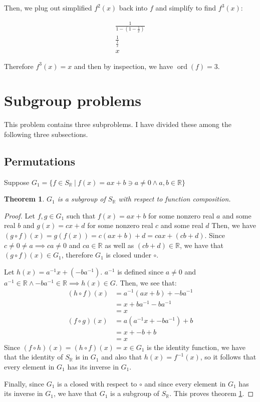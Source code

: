 \documentclass[12pt]{article}
\newcommand{\reals}{\mathbb{R}}
\newcommand{\ord}{\operatorname{ord}}
\newtheorem{thm}{Theorem}
\begin{document}
Then, we plug out simplified $f^2(x)$ back into $f$ and simplify to find $f^3(x)$:

\begin{align}
	\frac{1}{1-(1 - \frac{1}{x})} \\
	\frac{1}{\frac{1}{x}} \\
	x
\end{align}

Therefore $f^3(x) = x$ and then by inspection, we have $\ord(f) = 3$.

\section{Subgroup problems}

This problem contains three subproblems.
I have divided these among the following three subsections.

\subsection{Permutations} \label{sub1}

Suppose $G_1 = \{ f \in S_{\reals}\ |\ f(x) = ax + b \ni a \neq 0 \land a,b \in \reals \}$

\begin{thm} \label{thm5}
	$G_1$ is a subgroup of $S_{\reals}$ with respect to function composition.
\end{thm} 

\begin{proof}
	Let $f,g \in G_1$ such that
	$f(x) = ax + b$ for some nonzero real $a$ and some real $b$ and
	$g(x) = cx + d$ for some nonzero real $c$ and some real $d$
	Then, we have
	$(g \circ f)(x) = g(f(x)) = c(ax + b) + d = cax + (cb + d)$.
	Since $c \neq 0 \neq a \implies ca \neq 0$
	and $ca \in \reals$ as well as $(cb + d) \in \reals$,
	we have that $(g \circ f)(x) \in G_1$,
	therefore $G_1$ is closed under $\circ$.

	Let $h(x) = a^{-1}x + (-ba^{-1})$.
	$a^{-1}$ is defined since $a \neq 0$
	and $a^{-1} \in \reals \land -ba^{-1} \in \reals \implies h(x) \in G$.
	Then, we see that:
	\begin{align*}
		(h \circ f)(x) & = a^{-1}(ax + b) + -ba^{-1} \\
			       & = x + ba^{-1} -ba^{-1} \\
			       & = x \\
		(f \circ g)(x) & = a(a^{-1}x + -ba^{-1}) + b \\
			       & = x + -b + b \\
			       & = x
	\end{align*}
	Since $(f \circ h)(x) = (h \circ f)(x) = x \in G_1$ is the identity function,
	we have that the identity of $S_{\reals}$ is in $G_1$
	and also that $h(x) = f^{-1}(x)$,
	so it follows that every element in $G_1$ has its inverse in $G_1$.

	Finally, since $G_1$ is a closed with respect to $\circ$ and
	since every element in $G_1$ has its inverse in $G_1$,
	we have that $G_1$ is a subgroup of $S_{\reals}$.
	This proves theorem \ref{thm5}.
\end{proof}
\end{document}
